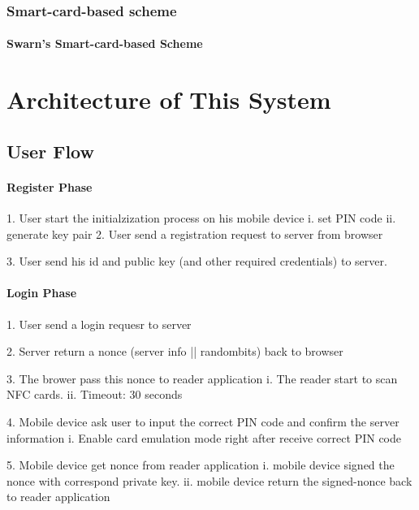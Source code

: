 \begin{CJK}{Bg5}{bsmi}
\subsection{Smart-card-based scheme}

\subsubsection{Swarn's Smart-card-based Scheme}


\chapter{Architecture of This System}

\section{User Flow}

\subsubsection{Register Phase}

	1. 	User start the initialzization process on his mobile device
		i.  set PIN code
		ii. generate key pair
	2.	User send a registration request to server from browser

	3.	User send his id and public key (and other required credentials) to server.

\subsubsection{Login Phase}

	1. User send a login requesr to server

	2. Server return a nonce ({server info || randombits}) back to browser

	3. The brower pass this nonce to reader application
		i.	The reader start to scan NFC cards.
		ii.	Timeout: 30 seconds

	4. Mobile device ask user to input the correct PIN code and confirm the server information
		i.	Enable card emulation mode right after receive correct PIN code

	5. Mobile device get nonce from reader application
		i.	mobile device signed the nonce with correspond private key.
		ii.	mobile device return the signed-nonce back to reader application


\end{CJK}
